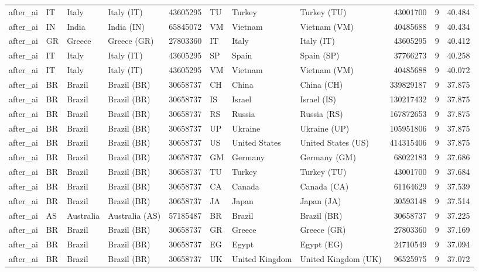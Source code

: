 \begin{tabular}{llllrlllrrr}
after\_ai & IT & Italy & Italy (IT) & 43605295 & TU & Turkey & Turkey (TU) & 43001700 & 9 & 40.484 \\
after\_ai & IN & India & India (IN) & 65845072 & VM & Vietnam & Vietnam (VM) & 40485688 & 9 & 40.434 \\
after\_ai & GR & Greece & Greece (GR) & 27803360 & IT & Italy & Italy (IT) & 43605295 & 9 & 40.412 \\
after\_ai & IT & Italy & Italy (IT) & 43605295 & SP & Spain & Spain (SP) & 37766273 & 9 & 40.258 \\
after\_ai & IT & Italy & Italy (IT) & 43605295 & VM & Vietnam & Vietnam (VM) & 40485688 & 9 & 40.072 \\
after\_ai & BR & Brazil & Brazil (BR) & 30658737 & CH & China & China (CH) & 339829187 & 9 & 37.875 \\
after\_ai & BR & Brazil & Brazil (BR) & 30658737 & IS & Israel & Israel (IS) & 130217432 & 9 & 37.875 \\
after\_ai & BR & Brazil & Brazil (BR) & 30658737 & RS & Russia & Russia (RS) & 167872653 & 9 & 37.875 \\
after\_ai & BR & Brazil & Brazil (BR) & 30658737 & UP & Ukraine & Ukraine (UP) & 105951806 & 9 & 37.875 \\
after\_ai & BR & Brazil & Brazil (BR) & 30658737 & US & United States & United States (US) & 414315406 & 9 & 37.875 \\
after\_ai & BR & Brazil & Brazil (BR) & 30658737 & GM & Germany & Germany (GM) & 68022183 & 9 & 37.686 \\
after\_ai & BR & Brazil & Brazil (BR) & 30658737 & TU & Turkey & Turkey (TU) & 43001700 & 9 & 37.684 \\
after\_ai & BR & Brazil & Brazil (BR) & 30658737 & CA & Canada & Canada (CA) & 61164629 & 9 & 37.539 \\
after\_ai & BR & Brazil & Brazil (BR) & 30658737 & JA & Japan & Japan (JA) & 30593148 & 9 & 37.514 \\
after\_ai & AS & Australia & Australia (AS) & 57185487 & BR & Brazil & Brazil (BR) & 30658737 & 9 & 37.225 \\
after\_ai & BR & Brazil & Brazil (BR) & 30658737 & GR & Greece & Greece (GR) & 27803360 & 9 & 37.169 \\
after\_ai & BR & Brazil & Brazil (BR) & 30658737 & EG & Egypt & Egypt (EG) & 24710549 & 9 & 37.094 \\
after\_ai & BR & Brazil & Brazil (BR) & 30658737 & UK & United Kingdom & United Kingdom (UK) & 96525975 & 9 & 37.072 \\

\end{tabular}
